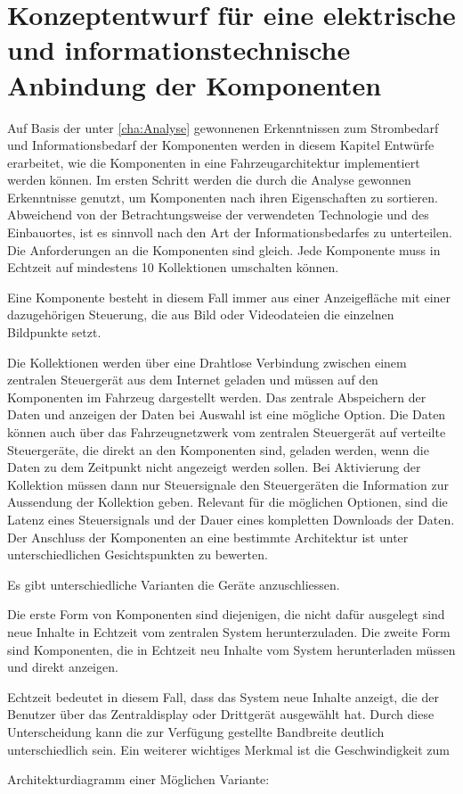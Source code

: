 \chapter{Konzeptentwurf für eine elektrische und informationstechnische Anbindung der Komponenten} \label{cha:Konzeptentwurf}
Auf Basis der unter \ref{cha:Analyse} gewonnenen Erkenntnissen zum Strombedarf und Informationsbedarf der Komponenten werden in diesem Kapitel Entwürfe erarbeitet, wie die Komponenten in eine Fahrzeugarchitektur implementiert werden können.
Im ersten Schritt werden die durch die Analyse gewonnen Erkenntnisse genutzt, um Komponenten nach ihren Eigenschaften zu sortieren.
Abweichend von der Betrachtungsweise der verwendeten Technologie und des Einbauortes, ist es sinnvoll nach den Art der Informationsbedarfes zu unterteilen.
Die Anforderungen an die Komponenten sind gleich. Jede Komponente muss in Echtzeit auf mindestens 10 Kollektionen umschalten können.

Eine Komponente besteht in diesem Fall immer aus einer Anzeigefläche mit einer dazugehörigen Steuerung, die aus Bild oder Videodateien die einzelnen Bildpunkte setzt.

Die Kollektionen werden über eine Drahtlose Verbindung zwischen einem zentralen Steuergerät aus dem Internet geladen und müssen auf den Komponenten im Fahrzeug dargestellt werden. 
Das zentrale Abspeichern der Daten und anzeigen der Daten bei Auswahl ist eine mögliche Option.
Die Daten können auch über das Fahrzeugnetzwerk vom zentralen Steuergerät auf verteilte Steuergeräte, die direkt an den Komponenten sind, geladen werden, wenn die Daten zu dem Zeitpunkt nicht angezeigt werden sollen. Bei Aktivierung der Kollektion müssen dann nur Steuersignale den Steuergeräten die Information zur Aussendung der Kollektion geben.
Relevant für die möglichen Optionen, sind die Latenz eines Steuersignals und der Dauer eines kompletten Downloads der Daten.
Der Anschluss der Komponenten an eine bestimmte Architektur ist unter unterschiedlichen Gesichtspunkten zu bewerten.

Es gibt unterschiedliche Varianten die Geräte anzuschliessen.

Die erste Form von Komponenten sind diejenigen, die nicht dafür ausgelegt sind neue Inhalte in Echtzeit vom zentralen System herunterzuladen.
Die zweite Form sind Komponenten, die in Echtzeit neu Inhalte vom System herunterladen müssen und direkt anzeigen.

Echtzeit bedeutet in diesem Fall, dass das System neue Inhalte anzeigt, die der Benutzer über das Zentraldisplay oder Drittgerät ausgewählt hat.
Durch diese Unterscheidung kann die zur Verfügung gestellte Bandbreite deutlich unterschiedlich sein. 
Ein weiterer wichtiges Merkmal ist die Geschwindigkeit zum 


Architekturdiagramm einer Möglichen Variante:
